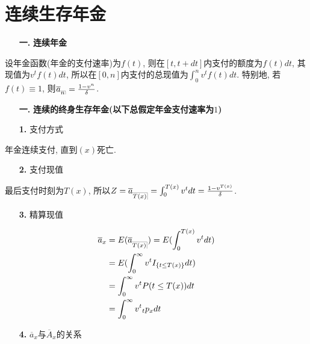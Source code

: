 \documentclass[a4paper,10pt]{ctexbook}
\makeatletter
\newcommand{\hei}{\CJKfamily{hei}}      %
\DeclareRobustCommand{\annu}[1]{_{%
    \def\arraystretch{0}%
    \setlength\arraycolsep{1pt}%
    \setlength\arrayrulewidth{.2pt}%
    \begin{array}[b]{@{}c|}\hline
        \\[\arraycolsep]%
        \scriptstyle #1%
    \end{array}%
}}
\makeatother
\begin{document}
\section{连续生存年金}
\begin{itemize}
    \item[{\bf\hei 一.}]{\bf\hei 连续年金}
\end{itemize}

设年金函数(年金的支付速率)为$f(t)$, 则在$[t,t+dt]$内支付的额度为$f(t)dt$, 其现值为$v^tf(t)dt$, 所以在$[0,n]$内支付的总现值为$\int_0^n v^tf(t)dt$. 特别地, 若$f(t) \equiv 1$, 则$\overline{a}_{\annu n} = \frac{1-v^n}{\delta}$.

\begin{itemize}
    \item[{\bf\hei 一.}]{\bf\hei 连续的终身生存年金(以下总假定年金支付速率为$1$)}
\end{itemize}

\begin{itemize}
    \item[{\bf\hei 1.}] 支付方式
\end{itemize}

年金连续支付, 直到$(x)$死亡.

\begin{itemize}
    \item[{\bf\hei 2.}] 支付现值
\end{itemize}

最后支付时刻为$T(x)$, 所以$Z = \overline{a}_{\annu{T(x)}} = \int_0^{T(x)} v^tdt = \frac{1-v^{T(x)}}{\delta}$.

\begin{itemize}
    \item[{\bf\hei 3.}] 精算现值
\end{itemize}

\begin{align*}
    \overline{a}_x & = E(\overline{a}_{\annu{T(x)}}) = E(\int_0^{T(x)} v^tdt) \\
                   & = E(\int_0^{\infty} v^tI_{\{t \leq T(x)\}}dt)            \\
                   & = \int_0^{\infty} v^tP(t \leq T(x))dt                    \\
                   & = \int_0^{\infty} v^t{}_{t}p_xdt
\end{align*}

\begin{itemize}
    \item[{\bf\hei 4.}] $\overline{a}_x$与$\overline{A}_x$的关系
\end{itemize}
\end{document}

